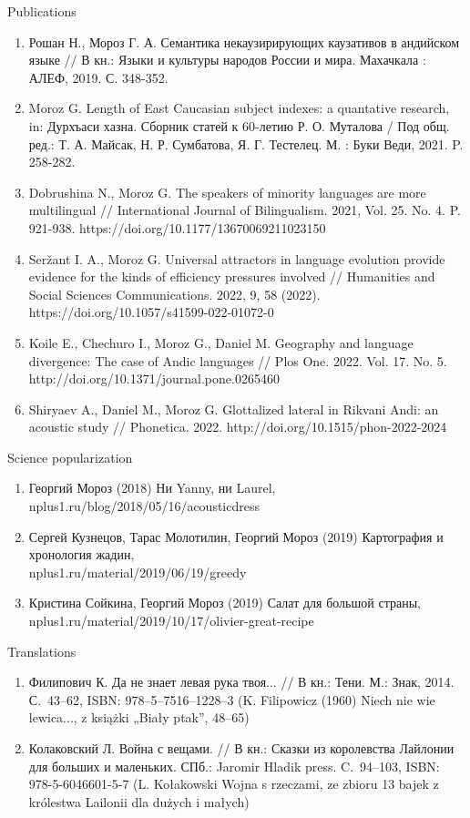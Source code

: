 \documentclass{resume} %
\begin{document}
\begin{rSection}{Publications}
\begin{enumerate}
\item Рошан Н., Мороз Г. А. Семантика некаузирирующих каузативов в андийском языке // В кн.: Языки и культуры народов России и мира. Махачкала : АЛЕФ, 2019. С. 348-352.
\item Moroz G. Length of East Caucasian subject indexes: a quantative research, in: Дурхъаси хазна. Сборник статей к 60-летию Р. О. Муталова / Под общ. ред.: Т. А. Майсак, Н. Р. Сумбатова, Я. Г. Тестелец. М. : Буки Веди, 2021. P. 258-282.
\item Dobrushina N., Moroz G. The speakers of minority languages are more multilingual // International Journal of Bilingualism. 2021, Vol. 25. No. 4. P. 921-938. https://doi.org/10.1177/13670069211023150
\item Seržant I. A., Moroz G. Universal attractors in language evolution provide evidence for the kinds of efficiency pressures involved // Humanities and Social Sciences Communications. 2022, 9, 58 (2022). https://doi.org/10.1057/s41599-022-01072-0
\item Koile E., Chechuro I., Moroz G., Daniel M. Geography and language divergence: The case of Andic languages // Plos One. 2022. Vol. 17. No. 5. http://doi.org/10.1371/journal.pone.0265460
\item Shiryaev A., Daniel M., Moroz G. Glottalized lateral in Rikvani Andi: an acoustic study // Phonetica. 2022. http://doi.org/10.1515/phon-2022-2024

\end{enumerate}
\end{rSection}

\begin{rSection}{Science popularization}
\begin{enumerate}
\item Георгий Мороз (2018)  Ни Yanny, ни Laurel, \\ nplus1.ru/blog/2018/05/16/acousticdress
\item Сергей Кузнецов, Тарас Молотилин, Георгий Мороз (2019) Картография и хронология жадин, \\ nplus1.ru/material/2019/06/19/greedy
\item Кристина Сойкина, Георгий Мороз (2019) Салат для большой страны, \\ nplus1.ru/material/2019/10/17/olivier-great-recipe
\end{enumerate}
\end{rSection}

\begin{rSection}{Translations}
\begin{enumerate}
\item Филипович К. Да не знает левая рука твоя... // В кн.: Тени. М.: Знак, 2014. С.~43--62, ISBN: 978--5--7516--1228--3 (K. Filipowicz (1960) Niech nie wie lewica..., z książki „Biały ptak”, 48--65)
\item Колаковский Л. Война с вещами. // В кн.: Сказки из королевства Лайлонии для больших и маленьких. СПб.: Jaromir Hladik press. C.~94--103, ISBN: 978-5-6046601-5-7 (L. Kołakowski Wojna s rzeczami, ze zbioru 13 bajek z królestwa Lailonii dla dużych i małych)
\end{enumerate}
\end{rSection}
\end{document}
